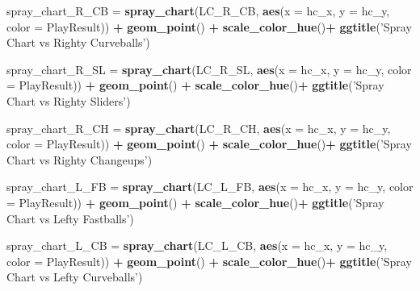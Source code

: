 \documentclass[]{article}
\newenvironment{Shaded}{\begin{snugshade}}{\end{snugshade}}
\newcommand{\KeywordTok}[1]{\textcolor[rgb]{0.13,0.29,0.53}{\textbf{#1}}}
\newcommand{\DataTypeTok}[1]{\textcolor[rgb]{0.13,0.29,0.53}{#1}}
\newcommand{\StringTok}[1]{\textcolor[rgb]{0.31,0.60,0.02}{#1}}
\newcommand{\OperatorTok}[1]{\textcolor[rgb]{0.81,0.36,0.00}{\textbf{#1}}}
\newcommand{\NormalTok}[1]{#1}
\begin{document}
\begin{Shaded}
\begin{Highlighting}[]
\NormalTok{spray_chart_R_CB =}\StringTok{ }\KeywordTok{spray_chart}\NormalTok{(LC_R_CB, }\KeywordTok{aes}\NormalTok{(}\DataTypeTok{x =}\NormalTok{ hc_x, }\DataTypeTok{y =}\NormalTok{ hc_y, }\DataTypeTok{color =}\NormalTok{ PlayResult)) }\OperatorTok{+}
\StringTok{  }\KeywordTok{geom_point}\NormalTok{() }\OperatorTok{+}
\StringTok{  }\KeywordTok{scale_color_hue}\NormalTok{()}\OperatorTok{+}
\StringTok{  }\KeywordTok{ggtitle}\NormalTok{(}\StringTok{'Spray Chart vs Righty Curveballs'}\NormalTok{)}

\NormalTok{spray_chart_R_SL =}\StringTok{ }\KeywordTok{spray_chart}\NormalTok{(LC_R_SL, }\KeywordTok{aes}\NormalTok{(}\DataTypeTok{x =}\NormalTok{ hc_x, }\DataTypeTok{y =}\NormalTok{ hc_y, }\DataTypeTok{color =}\NormalTok{ PlayResult)) }\OperatorTok{+}
\StringTok{  }\KeywordTok{geom_point}\NormalTok{() }\OperatorTok{+}
\StringTok{  }\KeywordTok{scale_color_hue}\NormalTok{()}\OperatorTok{+}
\StringTok{  }\KeywordTok{ggtitle}\NormalTok{(}\StringTok{'Spray Chart vs Righty Sliders'}\NormalTok{)}

\NormalTok{spray_chart_R_CH =}\StringTok{ }\KeywordTok{spray_chart}\NormalTok{(LC_R_CH, }\KeywordTok{aes}\NormalTok{(}\DataTypeTok{x =}\NormalTok{ hc_x, }\DataTypeTok{y =}\NormalTok{ hc_y, }\DataTypeTok{color =}\NormalTok{ PlayResult)) }\OperatorTok{+}
\StringTok{  }\KeywordTok{geom_point}\NormalTok{() }\OperatorTok{+}
\StringTok{  }\KeywordTok{scale_color_hue}\NormalTok{()}\OperatorTok{+}
\StringTok{  }\KeywordTok{ggtitle}\NormalTok{(}\StringTok{'Spray Chart vs Righty Changeups'}\NormalTok{)}

\NormalTok{spray_chart_L_FB =}\StringTok{ }\KeywordTok{spray_chart}\NormalTok{(LC_L_FB, }\KeywordTok{aes}\NormalTok{(}\DataTypeTok{x =}\NormalTok{ hc_x, }\DataTypeTok{y =}\NormalTok{ hc_y, }\DataTypeTok{color =}\NormalTok{ PlayResult)) }\OperatorTok{+}
\StringTok{  }\KeywordTok{geom_point}\NormalTok{() }\OperatorTok{+}
\StringTok{  }\KeywordTok{scale_color_hue}\NormalTok{()}\OperatorTok{+}
\StringTok{  }\KeywordTok{ggtitle}\NormalTok{(}\StringTok{'Spray Chart vs Lefty Fastballs'}\NormalTok{)}

\NormalTok{spray_chart_L_CB =}\StringTok{ }\KeywordTok{spray_chart}\NormalTok{(LC_L_CB, }\KeywordTok{aes}\NormalTok{(}\DataTypeTok{x =}\NormalTok{ hc_x, }\DataTypeTok{y =}\NormalTok{ hc_y, }\DataTypeTok{color =}\NormalTok{ PlayResult)) }\OperatorTok{+}
\StringTok{  }\KeywordTok{geom_point}\NormalTok{() }\OperatorTok{+}
\StringTok{  }\KeywordTok{scale_color_hue}\NormalTok{()}\OperatorTok{+}
\StringTok{  }\KeywordTok{ggtitle}\NormalTok{(}\StringTok{'Spray Chart vs Lefty Curveballs'}\NormalTok{)}


\end{Highlighting}
\end{Shaded}
\end{document}
